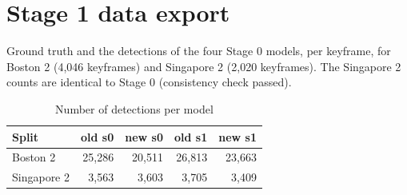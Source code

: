 \documentclass[10pt,a4paper]{article}
\begin{document}
\section{Stage 1 data export}
Ground truth and the detections of the four Stage 0 models, per keyframe, for Boston 2 (4{,}046 keyframes) and Singapore 2 (2{,}020 keyframes).
The Singapore 2 counts are identical to Stage 0 (consistency check passed).
\begin{table}[h]\centering\small\caption{Number of detections per model}
\begin{tabular}{lrrrr}\toprule
Split & old s0 & new s0 & old s1 & new s1\\\midrule
Boston 2 & 25{,}286 & 20{,}511 & 26{,}813 & 23{,}663\\
Singapore 2 & 3{,}563 & 3{,}603 & 3{,}705 & 3{,}409\\\bottomrule
\end{tabular}\end{table}

\FloatBarrier
\end{document}
